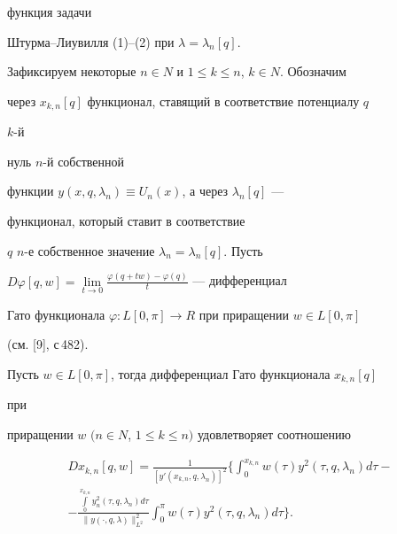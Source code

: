функция задачи 


Штурма--Лиувилля (1)--(2) при $\lambda=\lambda_n[q]$. 


Зафиксируем некоторые $n\in N$ и $1\le k\le n$, $k\in N$. Обозначим 


через $x_{k,n}[q]$ функционал, ставящий в соответствие потенциалу $q$\; 


$k$-й 


нуль $n$-й собственной 


функции $y(x,q,\lambda_n)\equiv U_n(x)$, а через $\lambda_n[q]$ --- 


функционал, который ставит в соответствие 


$q$\; $n$-е собственное значение $\lambda_n=\lambda_n[q]$. Пусть 


$D\varphi[q,w]=\lim\limits_{t\to0} 


\frac{\varphi(q+t w)-\varphi(q)}{t}$ --- дифференциал 


Гато функционала $\varphi:L[0,\pi]\to R$ при приращении $w\in L[0,\pi]$ 


(см. [9], с\,482). 


 


\begin{thm} 


Пусть $w\in L[0,\pi]$, тогда дифференциал Гато функционала $x_{k,n}[q]$ 


при 


приращении $w$ $(n\in N$, $1\le k\le n)$ удовлетворяет соотношению 


\begin{multline} 


D x_{k,n}[q,w]=\frac{1}{[y'(x_{k,n},q,\lambda_n)]^2}\bigg\{ 


\int^{x_{k,n}}_0 w(\tau)y^2(\tau,q,\lambda_n)d\tau- \\


-\frac{\int\limits^{x_{k,n}}_0y^2_n(\tau,q,\lambda_n)d\tau} 


{\|y(\cdot,q,\lambda)\|^2_{L^2}} 


\int^\pi_0 w(\tau)y^2(\tau,q,\lambda_n)d\tau\bigg\}. 


\end{multline} 


\end{thm} 


 


